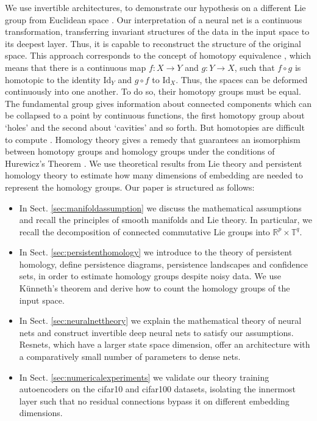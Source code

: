 \documentclass[envcountsect,runningheads]{llncs}
\begin{document}
We use invertible architectures, to demonstrate our hypothesis on a different Lie group from Euclidean space . Our interpretation of a neural net is a continuous transformation, transferring invariant structures of the data in the input space to its deepest layer. Thus, it is capable to reconstruct the structure of the original space. This approach corresponds to the concept of homotopy equivalence , which means that there is a continuous map $f: X \rightarrow Y$ and $g: Y \rightarrow X$, such that $f \circ g$ is homotopic to the identity $\text{Id}_Y$ and $g \circ f$ to $\text{Id}_X$. Thus, the spaces can be deformed continuously into one another. To do so, their homotopy groups must be equal. The fundamental group gives information about connected components which can be collapsed to a point by continuous functions, the first homotopy group about `holes' and the second about `cavities' and so forth. But homotopies are difficult to compute . Homology theory gives a remedy that guarantees an isomorphism between homotopy groups and homology groups under the conditions of Hurewicz's Theorem . We use theoretical results from Lie theory and persistent homology theory to estimate how many dimensions of embedding are needed to represent the homology groups. Our paper is structured as follows:
\begin{itemize}
    \item In Sect. \ref{sec:manifoldassumption} we discuss the mathematical assumptions and recall the principles of smooth manifolds and Lie theory. In particular, we recall the decomposition of connected commutative Lie groups into $\mathbb{R}^p \times \mathbb{T}^q$.
    \item In Sect. \ref{sec:persistenthomology} we introduce to the theory of persistent homology, define persistence diagrams, persistence landscapes and confidence sets, in order to estimate homology groups despite noisy data. We use Künneth's theorem and derive how to count the homology groups of the input space.
    \item In Sect. \ref{sec:neuralnettheory} we explain the mathematical theory of neural nets and construct invertible deep neural nets to satisfy our assumptions. Resnets, which have a larger state space dimension, offer an architecture with a comparatively small number of parameters to dense nets.
    \item In Sect. \ref{sec:numericalexperiments} we validate our theory training autoencoders on the cifar10 and cifar100 datasets, isolating the innermost layer such that no residual connections bypass it on different embedding dimensions.
\end{itemize}
\end{document}
